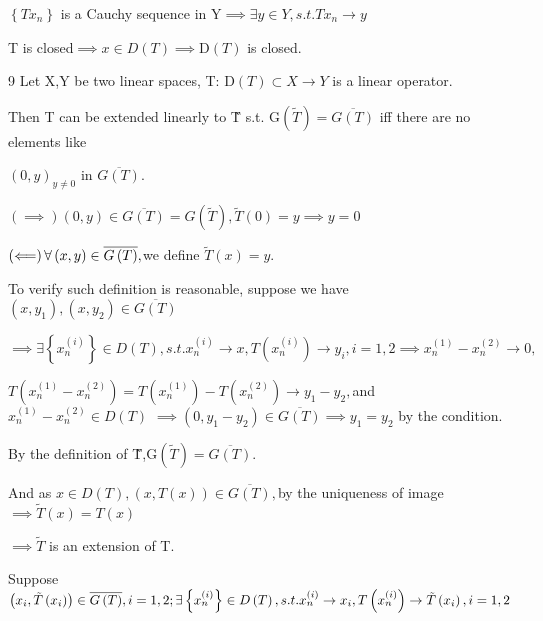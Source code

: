 \documentclass{ctexart}
\begin{document}
$\left\{ Tx_{n}\right\} $ is a Cauchy sequence in Y$\implies \exists y\in
Y,s.t.Tx_{n}\rightarrow y$

T is closed$\implies x\in D\left( T\right) \implies $D$\left( T\right) $ is
closed.

9 Let X,Y be two linear spaces, T: D$\left( T\right) \subset X\rightarrow Y$
is a linear operator.

Then T can be extended linearly to \~{T} s.t. G$\left( \tilde{T}\right) =%
\overline{G\left( T\right) }$ iff there are no elements like

$\left( 0,y\right) _{y\neq 0}$ in $\overline{G\left( T\right) }.$

$\left( \implies \right) \left( 0,y\right) \in \overline{G\left( T\right) }%
=G\left( \tilde{T}\right) ,\tilde{T}\left( 0\right) =y\implies y=0$

$\left( \Longleftarrow \right) \forall \left( x,y\right) \in \overline{%
G\left( T\right) },$we define $\tilde{T}\left( x\right) =y.$

To verify such definition is reasonable, suppose we have $\left(
x,y_{1}\right) ,\left( x,y_{2}\right) \in \overline{G\left( T\right) }$

$\implies \exists \left\{ x_{n}^{\left( i\right) }\right\} \in D\left(
T\right) ,s.t.x_{n}^{\left( i\right) }\rightarrow x,T\left( x_{n}^{\left(
i\right) }\right) \rightarrow y_{i},i=1,2\implies x_{n}^{\left( 1\right)
}-x_{n}^{\left( 2\right) }\rightarrow 0,$

$T\left( x_{n}^{\left( 1\right) }-x_{n}^{\left( 2\right) }\right) =T\left(
x_{n}^{\left( 1\right) }\right) -T\left( x_{n}^{\left( 2\right) }\right)
\rightarrow y_{1}-y_{2},$and $x_{n}^{\left( 1\right) }-x_{n}^{\left(
2\right) }\in D\left( T\right) $ $\implies \left( 0,y_{1}-y_{2}\right) \in 
\overline{G\left( T\right) }\implies y_{1}=y_{2}$ by the condition.

By the definition of \~{T},G$\left( \tilde{T}\right) =\overline{G\left(
T\right) }.$

And as $x\in D\left( T\right) ,\left( x,T\left( x\right) \right) \in 
\overline{G\left( T\right) },$by the uniqueness of image$\implies \tilde{T}%
\left( x\right) =T\left( x\right) $

$\implies \tilde{T}$ is an extension of T.

Suppose $\left( x_{i},\tilde{T}\left( x_{i}\right) \right) \in \overline{%
G\left( T\right) },i=1,2;\exists \left\{ x_{n}^{\left( i\right) }\right\}
\in D\left( T\right) ,s.t.x_{n}^{\left( i\right) }\rightarrow x_{i},T\left(
x_{n}^{\left( i\right) }\right) \rightarrow \tilde{T}\left( x_{i}\right)
,i=1,2$
\end{document}
